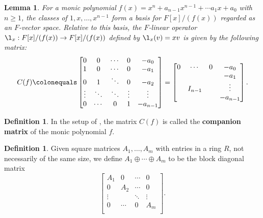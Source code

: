 \documentclass[12pt]{report}
\newtheorem{lemma}[theorem]{Lemma}
\numberwithin{equation}{section}
\numberwithin{theorem}{chapter}
\theoremstyle{definition}
\newtheorem{definition}[theorem]{Definition}
\newtheorem*{basic properties}{Basic Properties}
\newtheorem*{Important Remark}{Important Remark}
\newcommand{\df}[1]{{\bf #1}\index{#1}}
\DeclareMathOperator{\M}{Mat}
\begin{document}
\begin{lemma}\label{lem:companion}
For a monic polynomial $f(x) = x^n + a_{n-1}x^{n-1} +
  \cdots a_1 x + a_0$ with $n \geqslant 1$, the classes of $1, x, \dots,
  x^{n-1}$ form a basis for
  $F[x]/(f(x))$ regarded as an $F$-vector space. Relative to this basis, the $F$-linear operator $\l_x: F[x]/(f(x)) \to F[x]/(f(x))$ defined by $\l_x(v)=xv$ is given by the following matrix:
$$C(f) \colonequals
\begin{bmatrix}
0 & 0 &\cdots & 0 & -a_0 \\
1 & 0 & \cdots & 0 & -a_1 \\
0 & 1 & \ddots & 0 & -a_2 \\
\vdots & \ddots & \ddots & \vdots & \vdots \\
0 & \cdots & 0 & 1 & -a_{n-1} \\
\end{bmatrix} = \begin{bmatrix}
0 & \cdots & 0 & -a_0 \\
&&& -a_1 \\
& I_{n-1}&& \vdots\\
&&& -a_{n-1} \\
\end{bmatrix}.$$
\end{lemma}


	



\begin{definition} 
In the setup of , the matrix $C(f)$ is called the \df{companion matrix} of the monic polynomial $f$.
\end{definition}


\begin{definition}
Given square matrices $A_1, \ldots, A_m$ with entries in a ring $R$, not necessarily of the same size, we define $A_1 \oplus \cdots \oplus A_m$ to be the block diagonal matrix 
$$\begin{bmatrix} 
A_1 & 0 & \cdots & 0 \\
0 & A_2 &  \cdots & 0 \\
\vdots & & \ddots & \vdots \\
0 & \cdots & 0 & A_m \\
\end{bmatrix}.$$
\end{definition}

\end{document}
